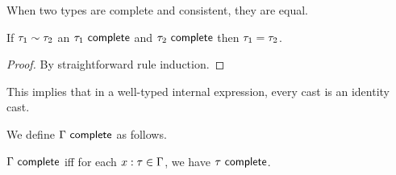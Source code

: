 When two types are complete and consistent, they are equal.

\begin{lem} If $\tau_1 \sim \tau_2$ an $\tau_1~\mathsf{complete}$ and $\tau_2~\mathsf{complete}$ then $\tau_1 = \tau_2$.
\end{lem}
\begin{proof} By straightforward rule induction. \end{proof}

This implies that in a well-typed internal expression, every cast is
an identity cast.

We define $\Gamma~\mathsf{complete}$ as follows.
\begin{defn}
$\Gamma~\mathsf{complete}$ iff for each $x : \tau \in \Gamma$, we have $\tau~\mathsf{complete}$.
\end{defn}